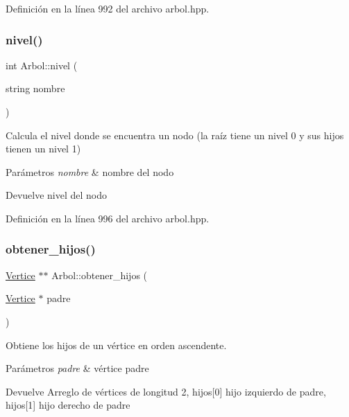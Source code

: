 Definición en la línea 992 del archivo arbol.\+hpp.

\mbox{\label{classArbol_a3a8a414e8e3f45bf90c481649928a86d}} 
\subsubsection{\texorpdfstring{nivel()}{nivel()}\hspace{0.1cm}{\footnotesize\ttfamily [2/2]}}
{\footnotesize\ttfamily int Arbol\+::nivel (\begin{DoxyParamCaption}\item[{string}]{nombre }\end{DoxyParamCaption})}



Calcula el nivel donde se encuentra un nodo (la raíz tiene un nivel 0 y sus hijos tienen un nivel 1) 


\begin{DoxyParams}{Parámetros}
{\em nombre} & nombre del nodo \\
\hline
\end{DoxyParams}
\begin{DoxyReturn}{Devuelve}
nivel del nodo 
\end{DoxyReturn}


Definición en la línea 996 del archivo arbol.\+hpp.

\mbox{\label{classArbol_a18066699977ab8095398d026ef2a13ac}} 
\subsubsection{\texorpdfstring{obtener\+\_\+hijos()}{obtener\_hijos()}}
{\footnotesize\ttfamily \hyperlink{classVertice}{Vertice} $\ast$$\ast$ Arbol\+::obtener\+\_\+hijos (\begin{DoxyParamCaption}\item[{\hyperlink{classVertice}{Vertice} $\ast$}]{padre }\end{DoxyParamCaption})\hspace{0.3cm}{\ttfamily [protected]}}



Obtiene los hijos de un vértice en orden ascendente. 


\begin{DoxyParams}{Parámetros}
{\em padre} & vértice padre \\
\hline
\end{DoxyParams}
\begin{DoxyReturn}{Devuelve}
Arreglo de vértices de longitud 2, hijos\mbox{[}0\mbox{]} hijo izquierdo de padre, hijos\mbox{[}1\mbox{]} hijo derecho de padre 
\end{DoxyReturn}


